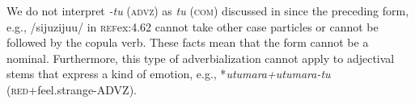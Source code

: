 We do not interpret \textit{{}-tu} (\textsc{advz}) as \textit{tu} (\textsc{com}) discussed in  since the preceding form, e.g., /sijuzijuu/ in \textsc{ref}{ex:4.62} cannot take other case particles or cannot be followed by the copula verb. These facts mean that the form cannot be a nominal. Furthermore, this type of adverbialization cannot apply to adjectival stems that express a kind of emotion, e.g., *\textit{utumara+utumara-tu} (\textsc{red}+feel.strange-ADVZ).
